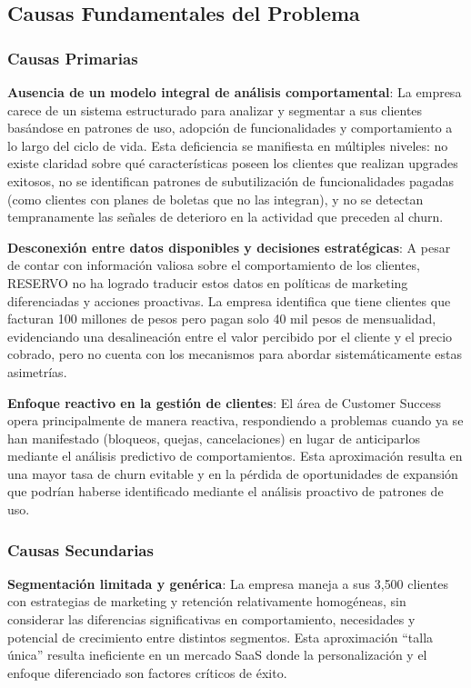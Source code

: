 \subsection{Causas Fundamentales del Problema}

\subsubsection{Causas Primarias}

\textbf{Ausencia de un modelo integral de análisis comportamental}: La empresa carece de un sistema estructurado para analizar y segmentar a sus clientes basándose en patrones de uso, adopción de funcionalidades y comportamiento a lo largo del ciclo de vida. Esta deficiencia se manifiesta en múltiples niveles: no existe claridad sobre qué características poseen los clientes que realizan upgrades exitosos, no se identifican patrones de subutilización de funcionalidades pagadas (como clientes con planes de boletas que no las integran), y no se detectan tempranamente las señales de deterioro en la actividad que preceden al churn.

\textbf{Desconexión entre datos disponibles y decisiones estratégicas}: A pesar de contar con información valiosa sobre el comportamiento de los clientes, RESERVO no ha logrado traducir estos datos en políticas de marketing diferenciadas y acciones proactivas. La empresa identifica que tiene clientes que facturan 100 millones de pesos pero pagan solo 40 mil pesos de mensualidad, evidenciando una desalineación entre el valor percibido por el cliente y el precio cobrado, pero no cuenta con los mecanismos para abordar sistemáticamente estas asimetrías.

\textbf{Enfoque reactivo en la gestión de clientes}: El área de Customer Success opera principalmente de manera reactiva, respondiendo a problemas cuando ya se han manifestado (bloqueos, quejas, cancelaciones) en lugar de anticiparlos mediante el análisis predictivo de comportamientos. Esta aproximación resulta en una mayor tasa de churn evitable y en la pérdida de oportunidades de expansión que podrían haberse identificado mediante el análisis proactivo de patrones de uso.

\subsubsection{Causas Secundarias}

\textbf{Segmentación limitada y genérica}: La empresa maneja a sus 3{,}500 clientes con estrategias de marketing y retención relativamente homogéneas, sin considerar las diferencias significativas en comportamiento, necesidades y potencial de crecimiento entre distintos segmentos. Esta aproximación ``talla única'' resulta ineficiente en un mercado SaaS donde la personalización y el enfoque diferenciado son factores críticos de éxito.

